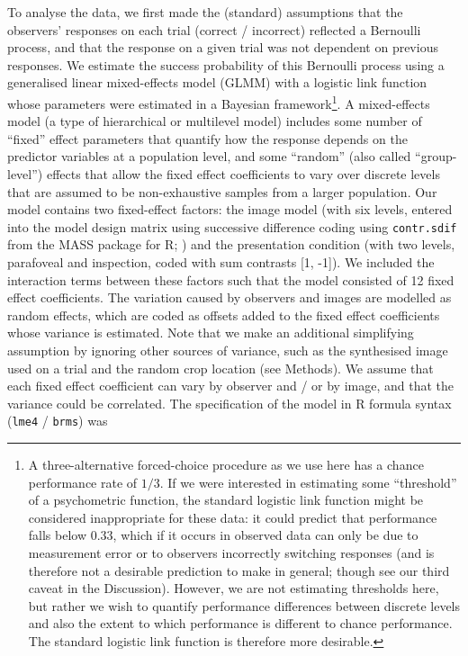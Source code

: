 \documentclass[doc, 11pt,a4paper,natbib]{apa6}\usepackage[]{graphicx}\usepackage[]{color}
\begin{document}
To analyse the data, we first made the (standard) assumptions that the observers' responses on each trial (correct / incorrect) reflected a Bernoulli process, and that the response on a given trial was not dependent on previous responses.
We estimate the success probability of this Bernoulli process using a generalised linear mixed-effects model (GLMM) with a logistic link function whose parameters were estimated in a Bayesian framework\footnote{
A three-alternative forced-choice procedure as we use here has a chance performance rate of $1/3$.
If we were interested in estimating some ``threshold'' of a psychometric function, the standard logistic link function might be considered inappropriate for these data: it could predict that performance falls below 0.33, which if it occurs in observed data can only be due to measurement error or to observers incorrectly switching responses (and is therefore not a desirable prediction to make in general; though see our third caveat in the Discussion).
However, we are not estimating thresholds here, but rather we wish to quantify performance differences between discrete levels and also the extent to which performance is different to chance performance.
The standard logistic link function is therefore more desirable.
}.
A mixed-effects model (a type of hierarchical or multilevel model) includes some number of ``fixed'' effect parameters that quantify how the response depends on the predictor variables at a population level, and some ``random'' (also called ``group-level'') effects that allow the fixed effect coefficients to vary over discrete levels that are assumed to be non-exhaustive samples from a larger population.
Our model contains two fixed-effect factors: the image model (with six levels, entered into the model design matrix using successive difference coding using \texttt{contr.sdif} from the MASS package for R; \citet{venables_modern_2002}) and the presentation condition (with two levels, parafoveal and inspection, coded with sum contrasts [1, -1]).
We included the interaction terms between these factors such that the model consisted of 12 fixed effect coefficients.
The variation caused by observers and images are modelled as random effects, which are coded as offsets added to the fixed effect coefficients whose variance is estimated.
Note that we make an additional simplifying assumption by ignoring other sources of variance, such as the synthesised image used on a trial and the random crop location (see Methods).
We assume that each fixed effect coefficient can vary by observer and / or by image, and that the variance could be correlated.
The specification of the model in R formula syntax (\texttt{lme4} / \texttt{brms}) was
\end{document}
